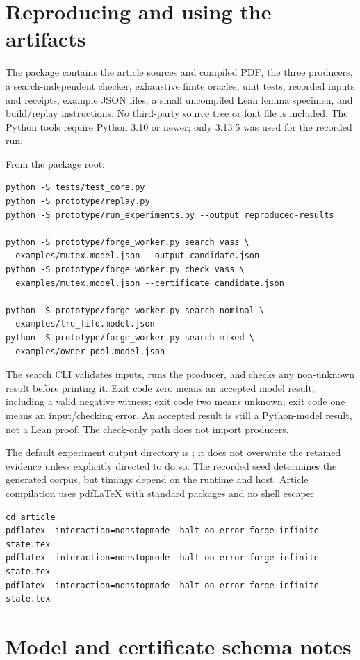 \section{Reproducing and using the artifacts}
\label{app:reproduce}
The package contains the article sources and compiled PDF, the three producers,
a search-independent checker, exhaustive finite oracles, unit tests, recorded
inputs and receipts, example JSON files, a small uncompiled Lean lemma specimen,
and build/replay instructions. No third-party source tree or font file is
included. The Python tools require Python 3.10 or newer; only 3.13.5 was used
for the recorded run.

From the package root:
\begin{lstlisting}
python -S tests/test_core.py
python -S prototype/replay.py
python -S prototype/run_experiments.py --output reproduced-results

python -S prototype/forge_worker.py search vass \
  examples/mutex.model.json --output candidate.json
python -S prototype/forge_worker.py check vass \
  examples/mutex.model.json --certificate candidate.json

python -S prototype/forge_worker.py search nominal \
  examples/lru_fifo.model.json
python -S prototype/forge_worker.py search mixed \
  examples/owner_pool.model.json
\end{lstlisting}
The search CLI validates inputs, runs the producer, and checks any non-unknown
result before printing it. Exit code zero means an accepted model result,
including a valid negative witness; exit code two means unknown; exit code one
means an input/checking error. An accepted result is still a Python-model
result, not a Lean proof. The check-only path does not import producers.

The default experiment output directory is \code{reproduced-results}; it does
not overwrite the retained evidence unless explicitly directed to do so.
The recorded seed determines the generated corpus, but timings depend on the
runtime and host. Article compilation uses pdfLaTeX with standard packages and
no shell escape:
\begin{lstlisting}
cd article
pdflatex -interaction=nonstopmode -halt-on-error forge-infinite-state.tex
pdflatex -interaction=nonstopmode -halt-on-error forge-infinite-state.tex
pdflatex -interaction=nonstopmode -halt-on-error forge-infinite-state.tex
\end{lstlisting}

\section{Model and certificate schema notes}
\label{app:schema}
